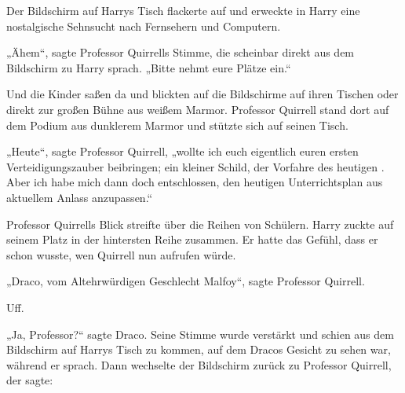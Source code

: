 Der Bildschirm auf Harrys Tisch flackerte auf und erweckte in Harry eine nostalgische Sehnsucht nach Fernsehern und Computern.

„Ähem“, sagte Professor Quirrells Stimme, die scheinbar direkt aus dem Bildschirm zu Harry sprach.
„Bitte nehmt eure Plätze ein.“

\later

Und die Kinder saßen da und blickten auf die Bildschirme auf ihren Tischen oder direkt zur großen Bühne aus weißem Marmor. Professor Quirrell stand dort auf dem Podium aus dunklerem Marmor und stützte sich auf seinen Tisch.

„Heute“, sagte Professor Quirrell, „wollte ich euch eigentlich euren ersten Verteidigungszauber beibringen; ein kleiner Schild, der Vorfahre des heutigen . Aber ich habe mich dann doch entschlossen, den heutigen Unterrichtsplan aus aktuellem Anlass anzupassen.“

Professor Quirrells Blick streifte über die Reihen von Schülern. Harry zuckte auf seinem Platz in der hintersten Reihe zusammen. Er hatte das Gefühl, dass er schon wusste, wen Quirrell nun aufrufen würde.

„Draco, vom Altehrwürdigen Geschlecht Malfoy“, sagte Professor Quirrell.

Uff.

„Ja, Professor?“ sagte Draco. Seine Stimme wurde verstärkt und schien aus dem Bildschirm auf Harrys Tisch zu kommen, auf dem Dracos Gesicht zu sehen war, während er sprach. Dann wechselte der Bildschirm zurück zu Professor Quirrell, der sagte:

